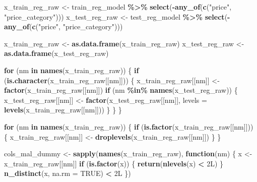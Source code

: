 \documentclass[
]{article}
\newenvironment{Shaded}{\begin{snugshade}}{\end{snugshade}}
\newcommand{\AttributeTok}[1]{\textcolor[rgb]{0.13,0.29,0.53}{#1}}
\newcommand{\ConstantTok}[1]{\textcolor[rgb]{0.56,0.35,0.01}{#1}}
\newcommand{\ControlFlowTok}[1]{\textcolor[rgb]{0.13,0.29,0.53}{\textbf{#1}}}
\newcommand{\FunctionTok}[1]{\textcolor[rgb]{0.13,0.29,0.53}{\textbf{#1}}}
\newcommand{\NormalTok}[1]{#1}
\newcommand{\OtherTok}[1]{\textcolor[rgb]{0.56,0.35,0.01}{#1}}
\newcommand{\SpecialCharTok}[1]{\textcolor[rgb]{0.81,0.36,0.00}{\textbf{#1}}}
\newcommand{\StringTok}[1]{\textcolor[rgb]{0.31,0.60,0.02}{#1}}
\begin{document}
\begin{Shaded}
\begin{Highlighting}[]
\NormalTok{x\_train\_reg\_raw }\OtherTok{\textless{}{-}}\NormalTok{ train\_reg\_model }\SpecialCharTok{\%\textgreater{}\%} \FunctionTok{select}\NormalTok{(}\SpecialCharTok{{-}}\FunctionTok{any\_of}\NormalTok{(}\FunctionTok{c}\NormalTok{(}\StringTok{"price"}\NormalTok{, }\StringTok{"price\_category"}\NormalTok{)))}
\NormalTok{x\_test\_reg\_raw  }\OtherTok{\textless{}{-}}\NormalTok{ test\_reg\_model  }\SpecialCharTok{\%\textgreater{}\%} \FunctionTok{select}\NormalTok{(}\SpecialCharTok{{-}}\FunctionTok{any\_of}\NormalTok{(}\FunctionTok{c}\NormalTok{(}\StringTok{"price"}\NormalTok{, }\StringTok{"price\_category"}\NormalTok{)))}

\NormalTok{x\_train\_reg\_raw }\OtherTok{\textless{}{-}} \FunctionTok{as.data.frame}\NormalTok{(x\_train\_reg\_raw)}
\NormalTok{x\_test\_reg\_raw }\OtherTok{\textless{}{-}} \FunctionTok{as.data.frame}\NormalTok{(x\_test\_reg\_raw)}

\ControlFlowTok{for}\NormalTok{ (nm }\ControlFlowTok{in} \FunctionTok{names}\NormalTok{(x\_train\_reg\_raw)) \{}
  \ControlFlowTok{if}\NormalTok{ (}\FunctionTok{is.character}\NormalTok{(x\_train\_reg\_raw[[nm]])) \{}
\NormalTok{    x\_train\_reg\_raw[[nm]] }\OtherTok{\textless{}{-}} \FunctionTok{factor}\NormalTok{(x\_train\_reg\_raw[[nm]])}
    \ControlFlowTok{if}\NormalTok{ (nm }\SpecialCharTok{\%in\%} \FunctionTok{names}\NormalTok{(x\_test\_reg\_raw)) \{}
\NormalTok{      x\_test\_reg\_raw[[nm]] }\OtherTok{\textless{}{-}} \FunctionTok{factor}\NormalTok{(x\_test\_reg\_raw[[nm]], }\AttributeTok{levels =} \FunctionTok{levels}\NormalTok{(x\_train\_reg\_raw[[nm]]))}
\NormalTok{    \}}
\NormalTok{  \}}
\NormalTok{\}}

\ControlFlowTok{for}\NormalTok{ (nm }\ControlFlowTok{in} \FunctionTok{names}\NormalTok{(x\_train\_reg\_raw)) \{}
  \ControlFlowTok{if}\NormalTok{ (}\FunctionTok{is.factor}\NormalTok{(x\_train\_reg\_raw[[nm]])) \{}
\NormalTok{    x\_train\_reg\_raw[[nm]] }\OtherTok{\textless{}{-}} \FunctionTok{droplevels}\NormalTok{(x\_train\_reg\_raw[[nm]])}
\NormalTok{  \}}
\NormalTok{\}}

\NormalTok{cols\_mal\_dummy }\OtherTok{\textless{}{-}} \FunctionTok{sapply}\NormalTok{(}\FunctionTok{names}\NormalTok{(x\_train\_reg\_raw), }\ControlFlowTok{function}\NormalTok{(nm) \{}
\NormalTok{  x }\OtherTok{\textless{}{-}}\NormalTok{ x\_train\_reg\_raw[[nm]]}
  \ControlFlowTok{if}\NormalTok{ (}\FunctionTok{is.factor}\NormalTok{(x)) \{}
    \FunctionTok{return}\NormalTok{(}\FunctionTok{nlevels}\NormalTok{(x) }\SpecialCharTok{\textless{}}\NormalTok{ 2L)}
\NormalTok{  \}}
  \FunctionTok{n\_distinct}\NormalTok{(x, }\AttributeTok{na.rm =} \ConstantTok{TRUE}\NormalTok{) }\SpecialCharTok{\textless{}}\NormalTok{ 2L}
\NormalTok{\})}


\end{Highlighting}
\end{Shaded}
\end{document}
